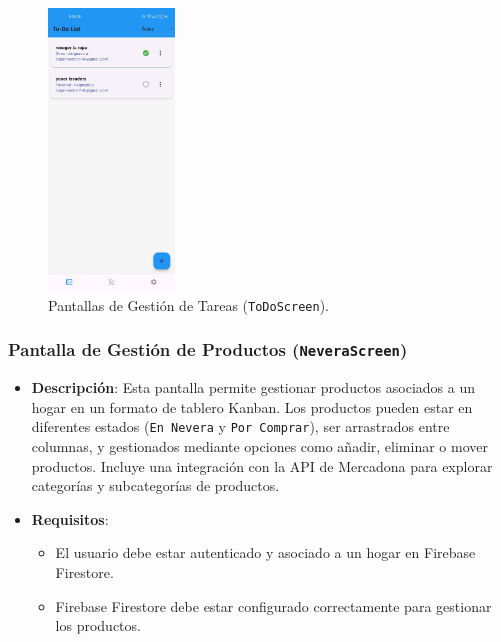 \documentclass{article}
\begin{document}
\begin{flushleft}
\begin{figure}[H]
   \includegraphics[width=0.3\textwidth]{TFG/img/img/todo1.jpeg}

    \caption{Pantallas de Gesti\'on de Tareas (\texttt{ToDoScreen}).}
    \label{fig:todo_screen}
\end{figure}

\clearpage


\subsubsection{Pantalla de Gesti\'on de Productos (\texttt{NeveraScreen})}
\begin{itemize}
    \item \textbf{Descripci\'on}: 
    Esta pantalla permite gestionar productos asociados a un hogar en un formato de tablero Kanban. Los productos pueden estar en diferentes estados (\texttt{En Nevera} y \texttt{Por Comprar}), ser arrastrados entre columnas, y gestionados mediante opciones como a\~nadir, eliminar o mover productos. Incluye una integraci\'on con la API de Mercadona para explorar categor\'ias y subcategor\'ias de productos.

    \item \textbf{Requisitos}:
    \begin{itemize}
        \item El usuario debe estar autenticado y asociado a un hogar en Firebase Firestore.
        \item Firebase Firestore debe estar configurado correctamente para gestionar los productos.
    \end{itemize}


\end{itemize}
\end{flushleft}
\end{document}
